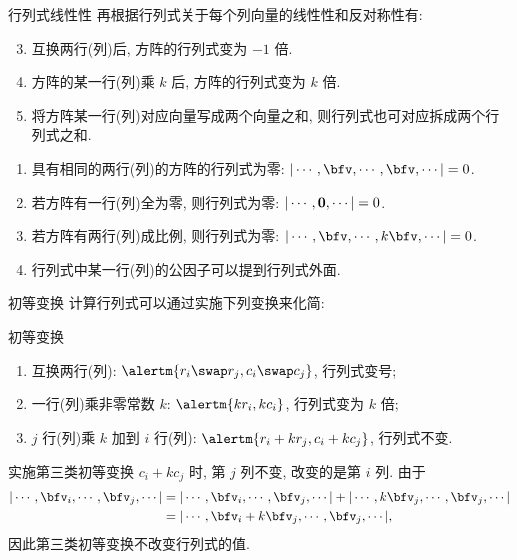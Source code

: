 \begin{frame}{行列式线性性}
	\onslide<+->
	再根据行列式关于每个列向量的线性性和反对称性有:
	\onslide<+->
	\begin{theorem@}
		\begin{enumerate}
			\setcounter{enumi}{2}
			\item 互换两行(列)后, 方阵的行列式变为 $-1$ 倍.
			\item 方阵的某一行(列)乘 $k$ 后, 方阵的行列式变为 $k$ 倍.
			\item 将方阵某一行(列)对应向量写成两个向量之和, 则行列式也可对应拆成两个行列式之和.
		\end{enumerate}
	\end{theorem@}
	\onslide<+->
	\begin{corollary}
		\begin{enumerate}
			\item 具有相同的两行(列)的方阵的行列式为零: $|\cdots,\bfv,\cdots,\bfv,\cdots|=0$.
			\item 若方阵有一行(列)全为零, 则行列式为零: $|\cdots,{\bf0},\cdots|=0$.
			\item 若方阵有两行(列)成比例, 则行列式为零: $|\cdots,\bfv,\cdots,k\bfv,\cdots|=0$.
			\item 行列式中某一行(列)的公因子可以提到行列式外面.
		\end{enumerate}
	\end{corollary}
\end{frame}


\begin{frame}{初等变换}
	\onslide<+->
	计算行列式可以通过实施下列变换来化简:
	\onslide<+->
	\begin{third}{初等变换}
		\begin{enumerate}
			\item 互换两行(列): $\alertm{r_i\swap r_j, c_i\swap c_j}$, 行列式变号;
			\item 一行(列)乘\alert{非零常数} $k$: $\alertm{kr_i, kc_i}$, 行列式变为 $k$ 倍;
			\item $j$ 行(列)乘 $k$ 加到 $i$ 行(列): $\alertm{r_i+kr_j, c_i+kc_j}$, 行列式不变.
		\end{enumerate}
	\end{third}
	\onslide<+->
	实施第三类初等变换 $c_i+kc_j$ 时, 第 $j$ 列不变, 改变的是第 $i$ 列.
	\onslide<+->
	由于
	\begin{align*}
		|\cdots,\bfv_i,\cdots,\bfv_j,\cdots|
		&=|\cdots,\bfv_i,\cdots,\bfv_j,\cdots|
		+|\cdots,k\bfv_j,\cdots,\bfv_j,\cdots|\\
		&=|\cdots,\bfv_i+k\bfv_j,\cdots,\bfv_j,\cdots|,
	\end{align*}
	\onslide<+->
	因此第三类初等变换不改变行列式的值.
\end{frame}


